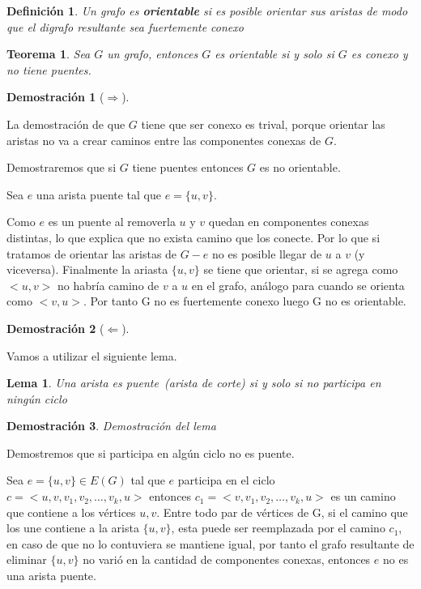 \documentclass[a4paper,1pt]{report}
\newtheorem*{teo}{Teorema}
\newtheorem*{dem}{Demostración}
\newtheorem*{dfn}{Definición}
\newtheorem*{lem}{Lema}
\begin{document}
\begin{dfn}
 Un grafo es \textbf{orientable} si es posible orientar sus aristas de modo que el digrafo resultante sea fuertemente conexo
\end{dfn}

\begin{teo}
 Sea $G$ un grafo, entonces $G$ es orientable si y solo si $G$ es conexo y no tiene puentes.
\end{teo}

\begin{dem}[$\Rightarrow$]
 
\end{dem}
La demostraci\'on de que $G$ tiene que ser conexo es trival, porque orientar las aristas no va a crear caminos entre las componentes conexas de $G$.

Demostraremos que si $G$ tiene puentes entonces $G$ es no orientable.

Sea $e$ una arista puente tal que $e=\{u,v\}$.

Como $e$ es un puente al removerla $u$ y $v$ quedan en componentes conexas distintas, lo que explica que no exista camino que los conecte. Por lo que si tratamos de orientar 
las aristas de $G-e$ no es posible llegar de $u$ a $v$ (y viceversa). Finalmente la ariasta $\{u,v\}$ se tiene que orientar, si se agrega como $<u,v>$ no habr\'ia camino de $v$ a $u$ en el grafo, an\'alogo para cuando se orienta como $<v,u>$. 
Por tanto  G no es fuertemente conexo luego G no es orientable. \\

\begin{dem}[$\Leftarrow$]
 
\end{dem}

Vamos a utilizar el siguiente lema.

\begin{lem}
 Una arista es puente~(arista de corte) si y solo si no participa en ningún ciclo
\end{lem}

\begin{dem}
Demostración del lema 
\end{dem}


Demostremos que si participa en algún ciclo no es puente.

Sea $e=\{u,v\}\in E(G)$ tal que $e$ participa en el ciclo $c=<u,v,v_1,v_2,\dots,v_k,u>$ entonces $c_1=<v,v_1,v_2,\dots,v_k,u>$ es un camino que contiene a los vértices $u,v$.
Entre todo par de vértices de G, si el camino que los une contiene a la arista $\{u,v\}$, esta puede ser reemplazada por el camino $c_1$, en caso de que no lo contuviera se mantiene igual, por tanto el grafo resultante de eliminar $\{u,v\}$ no varió en la cantidad de componentes conexas, entonces  $e$ no es una arista puente.\\
\end{document}
